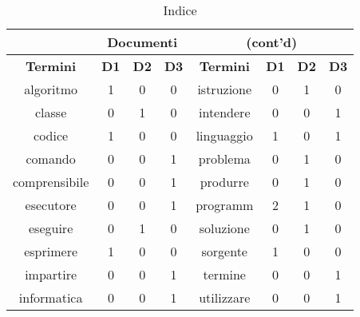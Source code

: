 \begin{table}[htpb]
	\centering
	\caption{Indice}
	\label{ex:index}
\begin{tabular}{c|c|c|c|c|c|c|c|}
	\cline{2-8}
	& \multicolumn{3}{c|}{\textbf{Documenti}} & \multicolumn{4}{c|}{\textbf{(cont'd)}}                     \\ \hline
	\multicolumn{1}{|c|}{\textbf{Termini}} & \textbf{D1} & \textbf{D2} & \textbf{D3} & \textbf{Termini} & \textbf{D1} & \textbf{D2} & \textbf{D3} \\ \hline
	\multicolumn{1}{|c|}{algoritmo}        & 1           & 0           & 0           & istruzione       & 0           & 1           & 0           \\ \hline
	\multicolumn{1}{|c|}{classe}           & 0           & 1           & 0           & intendere        & 0           & 0           & 1           \\ \hline
	\multicolumn{1}{|c|}{codice}           & 1           & 0           & 0           & linguaggio       & 1           & 0           & 1           \\ \hline
	\multicolumn{1}{|c|}{comando}          & 0           & 0           & 1           & problema         & 0           & 1           & 0           \\ \hline
	\multicolumn{1}{|c|}{comprensibile}    & 0           & 0           & 1           & produrre         & 0           & 1           & 0           \\ \hline
	\multicolumn{1}{|c|}{esecutore}        & 0           & 0           & 1           & programm         & 2           & 1           & 0           \\ \hline
	\multicolumn{1}{|c|}{eseguire}         & 0           & 1           & 0           & soluzione        & 0           & 1           & 0           \\ \hline
	\multicolumn{1}{|c|}{esprimere}        & 1           & 0           & 0           & sorgente         & 1           & 0           & 0           \\ \hline
	\multicolumn{1}{|c|}{impartire}        & 0           & 0           & 1           & termine          & 0           & 0           & 1           \\ \hline
	\multicolumn{1}{|c|}{informatica}      & 0           & 0           & 1           & utilizzare       & 0           & 0           & 1           \\ \hline
\end{tabular}
\end{table}

